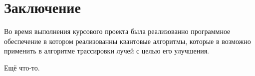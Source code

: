 \chapter*{Заключение}

Во время выполнения курсового проекта была реализованно программное обеспечение в котором реализованны квантовые алгоритмы, которые в возможно применить в алгоритме трассировки лучей с целью его улучшения.

Ещё что-то.

